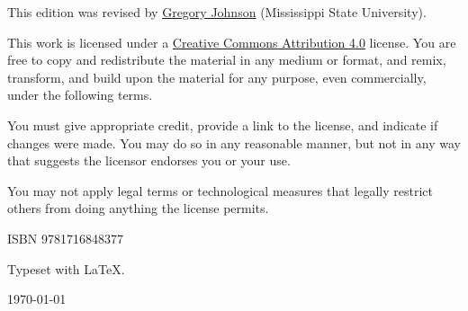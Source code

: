 \noindent This edition was revised by \href{http://loighic.net/}{Gregory Johnson} (Mississippi State University). %


\bigskip
\bigskip

\noindent \footnotesize This work is licensed under a \href{https://creativecommons.org/licenses/by/4.0/}{Creative Commons Attribution 4.0} license. 
You are free to copy and redistribute the material in any medium or format, and  remix, transform, and build upon the material for any purpose, even commercially, under the following terms.
\smallskip

\noindent You must give appropriate credit, provide a link to the license, and indicate if changes were made. You may do so in any reasonable manner, but not in any way that suggests the licensor endorses you or your use.
\smallskip

\noindent You may not apply legal terms or technological measures that legally restrict others from doing anything the license permits.

\normalsize 

\bigskip

\noindent ISBN 9781716848377  %
\medskip
\bigskip


\begin{center}

Typeset with \textsf{\LaTeX}.

\medskip

\today
\end{center}




